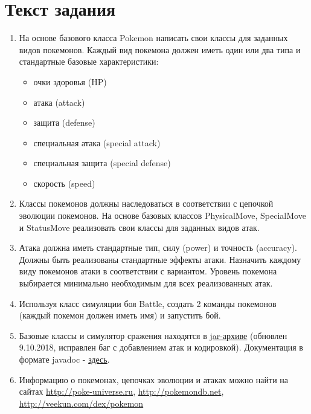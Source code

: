 



\itmo[
  variant=1500235,
  labn=2,
  discipline=Программирование,
  group=P3115,
  student=Владимир Мацюк,
  teacher=Сорокин Роман Борисович
]
\section*{Текст задания}

\begin{enumerate}
  \item На основе базового класса Pokemon написать свои классы для заданных видов покемонов. Каждый вид покемона должен иметь один или два типа и стандартные базовые характеристики:
        \begin{itemize}
          \item очки здоровья (HP)
          \item атака (attack)
          \item защита (defense)
          \item специальная атака (special attack)
          \item специальная защита (special defense)
          \item скорость (speed)
        \end{itemize}
  \item Классы покемонов должны наследоваться в соответствии с цепочкой эволюции покемонов. На основе базовых классов PhysicalMove, SpecialMove и StatusMove реализовать свои классы для заданных видов атак.
        
  \item Атака должна иметь стандартные тип, силу (power) и точность (accuracy). Должны быть реализованы стандартные эффекты атаки. Назначить каждому виду покемонов атаки в соответствии с вариантом. Уровень покемона выбирается минимально необходимым для всех реализованных атак.
        
  \item Используя класс симуляции боя Battle, создать 2 команды покемонов (каждый покемон должен иметь имя) и запустить бой.
        
  \item Базовые классы и симулятор сражения находятся в \href{https://se.ifmo.ru/documents/10180/660917/Pokemon.jar/a7ce60af-6ee6-47d0-a95e-e5ed9a697bd2}{jar-архиве} (обновлен 9.10.2018, исправлен баг с добавлением атак и кодировкой). Документация в формате javadoc - \href{https://se.ifmo.ru/~tony/doc/}{здесь}.
        
  \item Информацию о покемонах, цепочках эволюции и атаках можно найти на сайтах \url{http://poke-universe.ru}, \url{http://pokemondb.net}, \url{http://veekun.com/dex/pokemon}
\end{enumerate}

